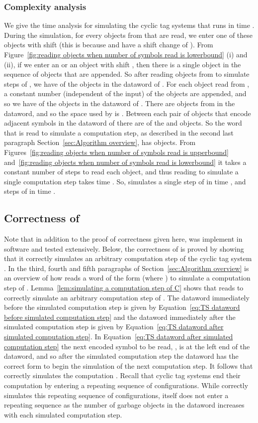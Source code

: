 \documentclass[11pt]{article} \usepackage{amsfonts,amsmath,amssymb,amsthm}
\begin{document}
\subsubsection{Complexity analysis}
We give the time analysis for  simulating the cyclic tag systems  that runs in time . 
During the simulation, for every  objects from  that are read, we enter one of these objects with shift  (this is because  and  have a shift change of ). 
From Figure~\ref{fig:reading objects when number of symbols read is lowerbound} (i) and (ii), if we enter an  or an  object with shift , then there is a single  object in the sequence of objects that are appended. So after reading  objects from  to simulate  steps of , we have  of the  objects in the dataword of . 
For each object read from , a constant number (independent of the input) of the  objects are appended, and so we have  of the  objects in the dataword of . 
There are  objects from  in the dataword, and so the space used by  is . 
Between each pair of objects  that encode adjacent symbols in the dataword of  there are  of the  and  objects. 
So the word  that is read to simulate a computation step, as described in the second last paragraph Section~\ref{sec:Algorithm overview}, has  objects.
From Figures~\ref{fig:reading objects when number of symbols read is upperbound} and~\ref{fig:reading objects when number of symbols read is lowerbound} it takes a constant number of steps to read each object, and thus reading  to simulate a single computation step takes time .
So,  simulates a single step of  in time , and  steps of  in time .


\subsection{Correctness of }
Note that in addition to the proof of correctness given here,  was implement in software and tested extensively. Below, the correctness of  is proved by showing that it correctly simulates an arbitrary computation step of the cyclic tag system . In the third, fourth and fifth paragraphs of Section~\ref{sec:Algorithm overview} is an overview of how  reads a word of the form  (where ) to simulate a computation step of . Lemma~\ref{lem:simulating a computation step of C} shows that  reads  to correctly simulate an arbitrary computation step of . The  dataword immediately before the simulated computation step is given by Equation~\eqref{eq:TS dataword before simulated computation step} and the  dataword immediately after the simulated computation step is given by Equation~\eqref{eq:TS dataword after simulated computation step}. In Equation~\eqref{eq:TS dataword after simulated computation step} the next encoded symbol to be read, , is at the left end of the dataword, and so after the simulated computation step  the dataword has the correct form to begin the simulation of the next computation step. It follows that  correctly simulates the computation . Recall that cyclic tag systems end their computation by entering a repeating sequence of configurations. While  correctly simulates this repeating sequence of configurations,  itself does not enter a repeating sequence as the number of garbage objects in the dataword increases with each simulated computation step.   
\end{document}
